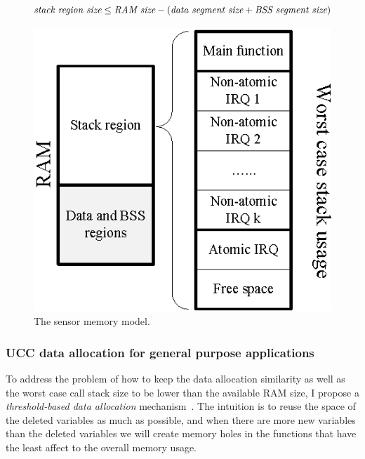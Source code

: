 \begin{small}
\begin{equation}
\mbox{\it stack region size}\leq \mbox{\it RAM size} - (\mbox{\it data segment size} + \mbox{\it BSS segment size})
\end{equation}

\end{small}

\begin{figure}[h]
\centering
\includegraphics[scale=1]{figures/ram.eps}
\caption{The sensor memory model.}
\label{ram}
\end{figure}

\subsubsection{UCC data allocation for general purpose applications}

To address the problem of how to keep the 
data allocation similarity as well as the worst case call stack
size to be lower than the available RAM size, I propose a {\em
threshold-based data allocation} mechanism~\cite{ucc}.  The intuition is to reuse
the space of the deleted variables as much as possible, and when
there are more new variables than the deleted variables we will create memory 
holes in the functions that have the least affect to the overall memory usage.

